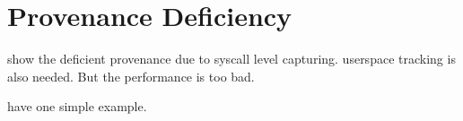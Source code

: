\section{Provenance Deficiency}
\label{s:defect}

show the deficient provenance due to syscall level capturing.
userspace tracking is also needed. But the performance is too bad.

have one simple example.

